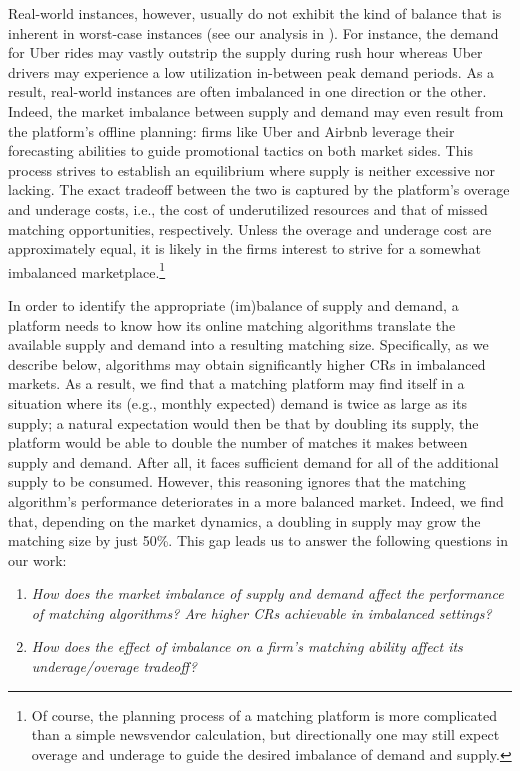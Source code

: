Real-world instances, however, usually do not  exhibit the kind of balance that is inherent in worst-case instances (see our analysis in ). For instance, the demand for Uber rides may vastly outstrip the supply during rush hour whereas Uber drivers may experience a low utilization in-between peak demand periods. 
As a result,  real-world instances are often imbalanced in one direction or the other. Indeed, the market imbalance between supply and demand may even result from the platform's offline planning: firms like Uber and Airbnb leverage their forecasting abilities to guide promotional tactics on both market sides. This process strives to establish an equilibrium where supply is neither excessive nor lacking. The exact tradeoff between the two is captured by the platform's overage and underage costs, i.e., the cost of underutilized resources and that of missed matching opportunities, respectively. Unless the overage and underage cost are approximately equal, it is likely in the firms interest to strive for a somewhat imbalanced marketplace.\footnote{Of course, the planning process of a matching platform is more complicated than a simple newsvendor calculation, but directionally one may still expect overage and underage to guide the desired imbalance of demand and supply.}

In order to identify the appropriate (im)balance of supply and demand, a platform needs to know how its online matching algorithms translate the available supply and demand into a resulting matching size. Specifically, as we describe below, algorithms may obtain significantly higher CRs in imbalanced markets. As a result, we find that a matching platform may find itself in a situation where its (e.g., monthly expected) demand is twice as large as its supply; a natural expectation would then be that by doubling its supply, the platform would be able to double the number of matches it makes between supply and demand. After all, it faces sufficient demand for all of the additional supply to be consumed. However, this reasoning ignores that the matching algorithm's performance deteriorates in a more balanced market. Indeed, we find that, depending on the market dynamics, a doubling in supply may grow the matching size by just 50\%. This gap leads us to answer the following questions in our work:

\begin{enumerate}
    \item \emph{How does the market imbalance of supply and demand affect the performance of matching algorithms? Are higher CRs achievable in imbalanced settings?}
    \item \emph{How does the effect of imbalance on a firm's matching ability affect its underage/overage tradeoff?}
\end{enumerate}

